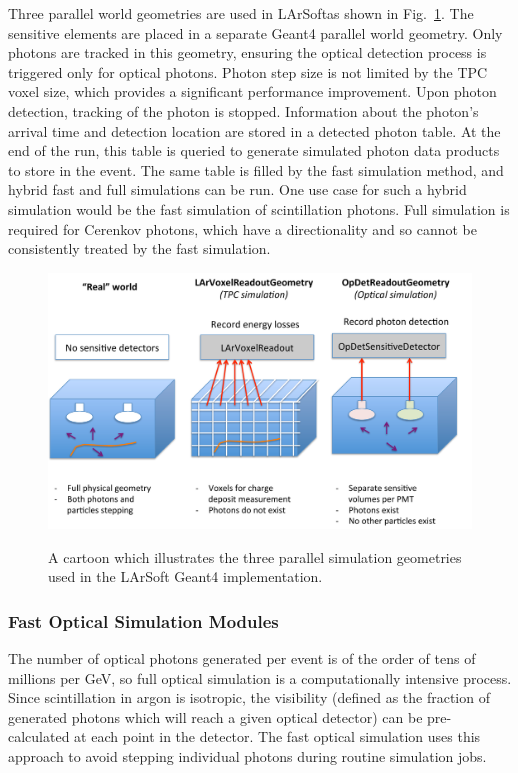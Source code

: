 \documentclass[12pt]{elsarticle}
\newcommand{\larsoft}{LArSoft}
\begin{document}
Three parallel world geometries are used in \larsoft as shown in Fig.~\ref{fig:parallelgeom}.
The sensitive elements are placed in a separate Geant4 parallel world geometry.  Only photons are tracked in this geometry, ensuring the optical  detection process is triggered only for optical photons.  Photon step size is not limited by the TPC voxel size, which provides a significant performance improvement. Upon photon detection, tracking of the photon is stopped. Information about the photon's arrival time and detection location are stored in a detected photon table.  At the end of the run, this table is queried to generate simulated photon data products to store in the event.  The same table is filled by the fast simulation method, and hybrid fast and full simulations can be run.  One use case for such a hybrid simulation would be the fast simulation of scintillation photons. Full simulation is required for Cerenkov photons, which have a directionality and so cannot be consistently treated by the fast simulation.


\begin{figure}[h]
\centering
\caption{A cartoon which illustrates the three parallel simulation geometries used in the \larsoft
Geant4 implementation.}
\includegraphics[width=6.0in]{./mtrls/imgs/ParallelGeomScheme.pdf}
\label{fig:parallelgeom}
\end{figure}

\subsubsection{Fast Optical Simulation Modules}

The number of optical photons generated per event is of the order of tens of millions per GeV, so full optical simulation is a computationally intensive process.  Since scintillation in argon is isotropic, the visibility (defined as the fraction of generated photons which will reach a given optical detector) can be pre-calculated at each point in the detector.  The fast optical simulation uses this approach to avoid stepping individual photons during routine simulation jobs.
\end{document}
